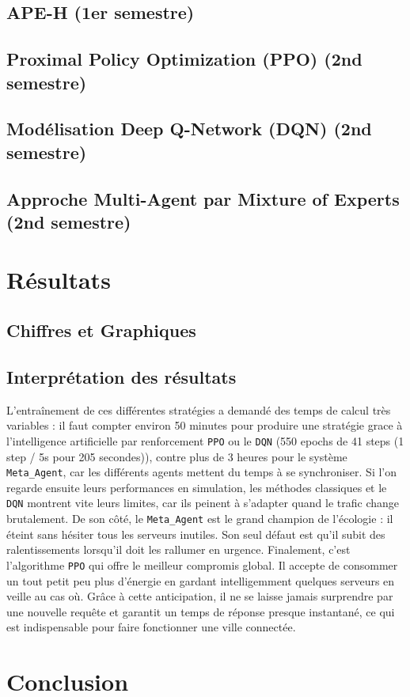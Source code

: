 \documentclass[a4paper,11pt]{article}
\begin{document}
\subsection{APE-H (1er semestre)}

\subsection{Proximal Policy Optimization (PPO) (2nd semestre)}

\subsection{Modélisation Deep Q-Network (DQN) (2nd semestre)}

\subsection{Approche Multi-Agent par Mixture of Experts (2nd semestre)}

\section{Résultats}
\subsection{Chiffres et Graphiques}

\subsection{Interprétation des résultats}

L'entraînement de ces différentes stratégies a demandé des temps de calcul très variables : il faut compter environ 50 minutes pour produire une stratégie grace à l'intelligence artificielle par renforcement \texttt{PPO} ou le \texttt{DQN} (550 epochs de 41 steps (1 step / 5s pour 205 secondes)), contre plus de 3 heures pour le système \texttt{Meta\_Agent}, car les différents agents mettent du temps à se synchroniser. Si l'on regarde ensuite leurs performances en simulation, les méthodes classiques et le \texttt{DQN} montrent vite leurs limites, car ils peinent à s'adapter quand le trafic change brutalement. De son côté, le \texttt{Meta\_Agent} est le grand champion de l'écologie : il éteint sans hésiter tous les serveurs inutiles. Son seul défaut est qu'il subit des ralentissements lorsqu'il doit les rallumer en urgence. Finalement, c'est l'algorithme \texttt{PPO} qui offre le meilleur compromis global. Il accepte de consommer un tout petit peu plus d'énergie en gardant intelligemment quelques serveurs en veille au cas où. Grâce à cette anticipation, il ne se laisse jamais surprendre par une nouvelle requête et garantit un temps de réponse presque instantané, ce qui est indispensable pour faire fonctionner une ville connectée.


\section{Conclusion}





\end{document}
